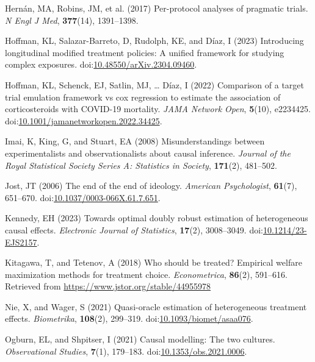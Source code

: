 \documentclass[
  singlecolumn]{article}
\newlength{\cslhangindent}
\newenvironment{CSLReferences}[2] %
 {\begin{list}{}{%
  \setlength{\itemindent}{0pt}
  \setlength{\leftmargin}{0pt}
  \setlength{\parsep}{0pt}
  \ifodd #1
   \setlength{\leftmargin}{\cslhangindent}
   \setlength{\itemindent}{-1\cslhangindent}
  \fi
  \setlength{\itemsep}{#2\baselineskip}}}
 {\end{list}}
\begin{document}
\begin{CSLReferences}{1}{0}
Hernán, MA, Robins, JM, et al. (2017) Per-protocol analyses of pragmatic
trials. \emph{N Engl J Med}, \textbf{377}(14), 1391--1398.

Hoffman, KL, Salazar-Barreto, D, Rudolph, KE, and Díaz, I (2023)
Introducing longitudinal modified treatment policies: A unified
framework for studying complex exposures.
doi:\href{https://doi.org/10.48550/arXiv.2304.09460}{10.48550/arXiv.2304.09460}.

Hoffman, KL, Schenck, EJ, Satlin, MJ, \ldots{} Díaz, I (2022) Comparison
of a target trial emulation framework vs cox regression to estimate the
association of corticosteroids with COVID-19 mortality. \emph{JAMA
Network Open}, \textbf{5}(10), e2234425.
doi:\href{https://doi.org/10.1001/jamanetworkopen.2022.34425}{10.1001/jamanetworkopen.2022.34425}.

Imai, K, King, G, and Stuart, EA (2008) Misunderstandings between
experimentalists and observationalists about causal inference.
\emph{Journal of the Royal Statistical Society Series A: Statistics in
Society}, \textbf{171}(2), 481--502.

Jost, JT (2006) The end of the end of ideology. \emph{American
Psychologist}, \textbf{61}(7), 651--670.
doi:\href{https://doi.org/10.1037/0003-066X.61.7.651}{10.1037/0003-066X.61.7.651}.

Kennedy, EH (2023) Towards optimal doubly robust estimation of
heterogeneous causal effects. \emph{Electronic Journal of Statistics},
\textbf{17}(2), 3008--3049.
doi:\href{https://doi.org/10.1214/23-EJS2157}{10.1214/23-EJS2157}.

Kitagawa, T, and Tetenov, A (2018) Who should be treated? Empirical
welfare maximization methods for treatment choice. \emph{Econometrica},
\textbf{86}(2), 591--616. Retrieved from
\url{https://www.jstor.org/stable/44955978}

Nie, X, and Wager, S (2021) Quasi-oracle estimation of heterogeneous
treatment effects. \emph{Biometrika}, \textbf{108}(2), 299--319.
doi:\href{https://doi.org/10.1093/biomet/asaa076}{10.1093/biomet/asaa076}.

Ogburn, EL, and Shpitser, I (2021) Causal modelling: The two cultures.
\emph{Observational Studies}, \textbf{7}(1), 179--183.
doi:\href{https://doi.org/10.1353/obs.2021.0006}{10.1353/obs.2021.0006}.


\end{CSLReferences}
\end{document}
